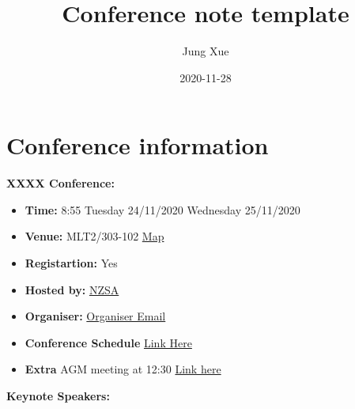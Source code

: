 \documentclass[
]{book}
\title{Conference note template}
\author{Jung Xue}
\date{2020-11-28}
\providecommand{\tightlist}{%
  \setlength{\itemsep}{0pt}\setlength{\parskip}{0pt}}
\begin{document}
\maketitle

{
\setcounter{tocdepth}{1}
\tableofcontents
}
\hypertarget{conference-information}{%
\chapter*{Conference information}\label{conference-information}}

\textbf{XXXX Conference:}

\begin{itemize}
\tightlist
\item
  \textbf{Time:} 8:55 Tuesday 24/11/2020 Wednesday 25/11/2020
\item
  \textbf{Venue:} MLT2/303-102 \href{https://cdn.auckland.ac.nz/assets/auckland/students/academic-information/exams-and-final-results/maps/city-campus.pdf}{Map}
\item
  \textbf{Registartion:} Yes
\item
  \textbf{Hosted by:} \href{https://www.stats.org.nz/nzsa-unconference-november-2020/}{NZSA}
\item
  \textbf{Organiser:} \href{}{Organiser Email}
\item
  \textbf{Conference Schedule} \href{https://nzsa2020.nz/sched.php}{Link Here}
\item
  \textbf{Extra} AGM meeting at 12:30 \href{https://nzsa2020.nz/NZSA-AGM-2020-Agenda.pdf}{Link here}
\end{itemize}

\textbf{Keynote Speakers:}
\end{document}
